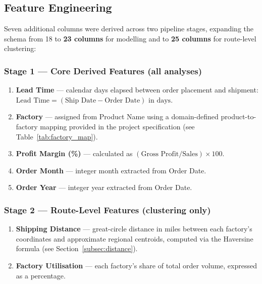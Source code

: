 \documentclass[12pt, a4paper]{article}
\begin{document}
\subsection{Feature Engineering}

Seven additional columns were derived across two pipeline stages,
expanding the schema from 18 to \textbf{23 columns} for modelling
and to \textbf{25 columns} for route-level clustering:

\subsubsection*{Stage 1 --- Core Derived Features (all analyses)}
\begin{enumerate}[leftmargin=*, label=\arabic*.]
    \item \textbf{Lead Time} --- calendar days elapsed between order
          placement and shipment:
          $\text{Lead Time} = (\text{Ship Date} - \text{Order Date})
          \text{ in days}$.
    \item \textbf{Factory} --- assigned from Product Name using a
          domain-defined product-to-factory mapping provided in the
          project specification (see Table~\ref{tab:factory_map}).
    \item \textbf{Profit Margin (\%)} --- calculated as
          $(\text{Gross Profit} / \text{Sales}) \times 100$.
    \item \textbf{Order Month} --- integer month extracted from Order Date.
    \item \textbf{Order Year} --- integer year extracted from Order Date.
\end{enumerate}

\subsubsection*{Stage 2 --- Route-Level Features (clustering only)}
\begin{enumerate}[leftmargin=*, label=\arabic*., start=6]
    \item \textbf{Shipping Distance} --- great-circle distance in miles
          between each factory's coordinates and approximate regional
          centroids, computed via the Haversine formula
          (see Section~\ref{subsec:distance}).
    \item \textbf{Factory Utilisation} --- each factory's share of total
          order volume, expressed as a percentage.
\end{enumerate}
\end{document}
